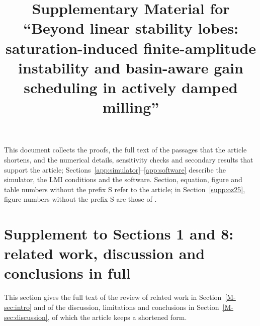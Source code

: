 \documentclass[preprint,12pt]{elsarticle}
\begin{document}
\begin{frontmatter}
\title{Supplementary Material for ``Beyond linear stability lobes: saturation-induced finite-amplitude instability and basin-aware gain scheduling in actively damped milling''}
\end{frontmatter}
This document collects the proofs, the full text of the passages that the article shortens, and the numerical details, sensitivity checks and secondary results that support the article; Sections~\ref{app:simulator}--\ref{app:software} describe the simulator, the LMI conditions and the software. Section, equation, figure and table numbers without the prefix S refer to the article; in Section~\ref{supp:oz25}, figure numbers without the prefix S are those of \citet{ozsoy2025frequency}.












\section{Supplement to Sections 1 and 8: related work, discussion and conclusions in full}\label{supp:std-framing}
This section gives the full text of the review of related work in Section~\ref{M-sec:intro} and of the discussion, limitations and conclusions in Section~\ref{M-sec:discussion}, of which the article keeps a shortened form.








\end{document}
